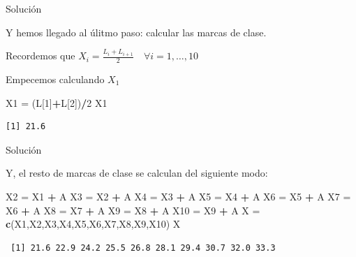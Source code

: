 \documentclass[
  ignorenonframetext,
]{beamer}
\newenvironment{Shaded}{\begin{snugshade}}{\end{snugshade}}
\newcommand{\DecValTok}[1]{\textcolor[rgb]{0.00,0.00,0.81}{#1}}
\newcommand{\KeywordTok}[1]{\textcolor[rgb]{0.13,0.29,0.53}{\textbf{#1}}}
\newcommand{\NormalTok}[1]{#1}
\newcommand{\OperatorTok}[1]{\textcolor[rgb]{0.81,0.36,0.00}{\textbf{#1}}}
\newcommand{\StringTok}[1]{\textcolor[rgb]{0.31,0.60,0.02}{#1}}
\begin{document}
\begin{frame}[fragile]{Solución}
\protect\hypertarget{soluciuxf3n-8}{}

Y hemos llegado al úlitmo paso: calcular las marcas de clase.

Recordemos que
\(X_i = \frac{L_{i}+L_{i+1}}{2} \quad\forall i=1,\dots,10\)

Empecemos calculando \(X_1\)

\begin{Shaded}
\begin{Highlighting}[]
\NormalTok{X1 =}\StringTok{ }\NormalTok{(L[}\DecValTok{1}\NormalTok{]}\OperatorTok{+}\NormalTok{L[}\DecValTok{2}\NormalTok{])}\OperatorTok{/}\DecValTok{2}
\NormalTok{X1}
\end{Highlighting}
\end{Shaded}

\begin{verbatim}
[1] 21.6
\end{verbatim}

\end{frame}

\begin{frame}[fragile]{Solución}
\protect\hypertarget{soluciuxf3n-9}{}

Y, el resto de marcas de clase se calculan del siguiente modo:

\begin{Shaded}
\begin{Highlighting}[]
\NormalTok{X2 =}\StringTok{ }\NormalTok{X1 }\OperatorTok{+}\StringTok{ }\NormalTok{A}
\NormalTok{X3 =}\StringTok{ }\NormalTok{X2 }\OperatorTok{+}\StringTok{ }\NormalTok{A}
\NormalTok{X4 =}\StringTok{ }\NormalTok{X3 }\OperatorTok{+}\StringTok{ }\NormalTok{A}
\NormalTok{X5 =}\StringTok{ }\NormalTok{X4 }\OperatorTok{+}\StringTok{ }\NormalTok{A}
\NormalTok{X6 =}\StringTok{ }\NormalTok{X5 }\OperatorTok{+}\StringTok{ }\NormalTok{A}
\NormalTok{X7 =}\StringTok{ }\NormalTok{X6 }\OperatorTok{+}\StringTok{ }\NormalTok{A}
\NormalTok{X8 =}\StringTok{ }\NormalTok{X7 }\OperatorTok{+}\StringTok{ }\NormalTok{A}
\NormalTok{X9 =}\StringTok{ }\NormalTok{X8 }\OperatorTok{+}\StringTok{ }\NormalTok{A}
\NormalTok{X10 =}\StringTok{ }\NormalTok{X9 }\OperatorTok{+}\StringTok{ }\NormalTok{A}
\NormalTok{X =}\StringTok{ }\KeywordTok{c}\NormalTok{(X1,X2,X3,X4,X5,X6,X7,X8,X9,X10)}
\NormalTok{X}
\end{Highlighting}
\end{Shaded}

\begin{verbatim}
 [1] 21.6 22.9 24.2 25.5 26.8 28.1 29.4 30.7 32.0 33.3
\end{verbatim}

\end{frame}
\end{document}

